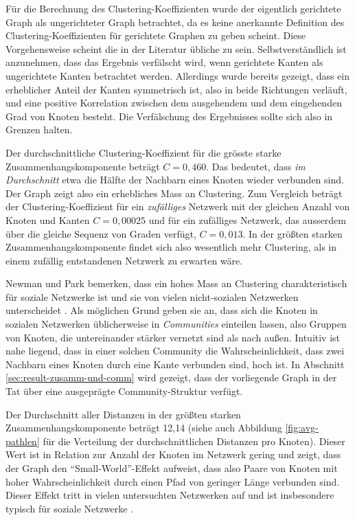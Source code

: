 Für die Berechnung des Clustering-Koeffizienten wurde der eigentlich
gerichtete Graph als ungerichteter Graph betrachtet, da es keine
anerkannte Definition des Clustering-Koeffizienten für gerichtete
Graphen zu geben scheint. Diese Vorgehensweise scheint die in der
Literatur übliche zu sein. Selbstverständlich ist anzunehmen, dass
das Ergebnis verfälscht wird, wenn gerichtete Kanten als
ungerichtete Kanten betrachtet werden. Allerdings wurde bereits
gezeigt, dass ein erheblicher Anteil der Kanten symmetrisch ist, also
in beide Richtungen verläuft, und eine positive Korrelation zwischen
dem ausgehendem und dem eingehenden Grad von Knoten besteht. Die
Verf\"alschung des Ergebnisses
sollte sich also in Grenzen halten.

Der durchschnittliche Clustering-Koeffizient für die grösste
starke Zusammenhangskomponente beträgt $C = 0,460$. Das bedeutet,
dass \emph{im Durchschnitt} etwa die Hälfte der Nachbarn eines
Knoten wieder verbunden sind. Der Graph zeigt also ein erhebliches
Mass an Clustering. Zum Vergleich beträgt der Clustering-Koeffizient
für ein \emph{zufälliges} Netzwerk mit der gleichen Anzahl von
Knoten und Kanten $C = 0,00025$ und für ein zufälliges Netzwerk,
das ausserdem über die gleiche Sequenz von Graden verfügt, $C =
0,013$. In der größten starken Zusammenhangskomponente findet sich
also wesentlich mehr Clustering, als in einem zufällig entstandenen
Netzwerk zu erwarten wäre.

Newman und Park bemerken, dass ein hohes Mass an Clustering
charakteristisch für soziale Netzwerke ist und sie von vielen
nicht-sozialen Netzwerken unterscheidet \cite{PhysRevE.68.036122}. Als
möglichen Grund geben sie an, dass sich die Knoten in sozialen
Netzwerken üblicherweise in \emph{Communities} einteilen lassen,
also Gruppen von Knoten, die untereinander stärker vernetzt sind als
nach außen. Intuitiv ist nahe liegend, dass in einer solchen Community
die Wahrscheinlichkeit, dass zwei Nachbarn eines Knoten durch eine
Kante verbunden sind, hoch ist. In Abschnitt
\ref{sec:result-zusamm-und-comm} wird gezeigt, dass der vorliegende
Graph in der Tat über eine ausgepr\"agte Community-Struktur verfügt.

Der Durchschnitt aller Distanzen in der größten starken
Zusammenhangskomponente beträgt 12,14 (siehe auch Abbildung
\ref{fig:avg-pathlen} für die Verteilung der durchschnittlichen
Distanzen pro Knoten). Dieser Wert ist in Relation zur Anzahl der
Knoten im Netzwerk gering und zeigt, dass der Graph den
``Small-World''-Effekt aufweist, dass also Paare von Knoten mit
hoher Wahrscheinlichkeit durch einen Pfad von geringer Länge
verbunden sind. Dieser Effekt tritt in vielen untersuchten Netzwerken
auf und ist insbesondere typisch für soziale Netzwerke
\cite{newman:167}.

